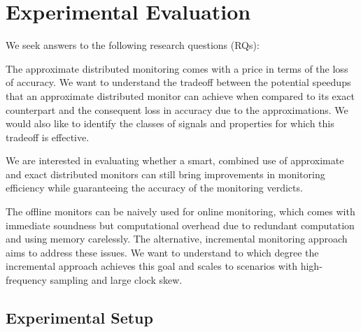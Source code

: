 \section{Experimental Evaluation} 
\label{sec:experiments}



We seek answers to the following research questions (RQs):
\begin{resq}
The approximate distributed monitoring comes with a price in terms of the loss of accuracy.
We want to understand the tradeoff between the potential speedups that an approximate distributed monitor can achieve when compared to its exact counterpart and the consequent loss in accuracy due to the approximations.
We would also like to identify the classes of signals and properties for which this tradeoff is effective. 
\end{resq}
\begin{resq}
We are interested in evaluating whether a smart, combined use of approximate and exact distributed monitors can still bring improvements in monitoring efficiency while guaranteeing the accuracy of the monitoring verdicts. 
\end{resq}
\bgroup \color{red}
\begin{resq}
The offline monitors can be naively used for online monitoring, which comes with immediate soundness but computational overhead due to redundant computation and using memory carelessly.
The alternative, incremental monitoring approach aims to address these issues.
We want to understand to which degree the incremental approach achieves this goal and scales to scenarios with high-frequency sampling and large clock skew.
\end{resq}
\egroup

\subsection{Experimental Setup}

